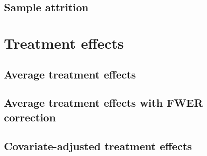 \documentclass[11pt]{article}
\begin{document}
        
        
        
        

	\clearpage

    \subsection{Sample attrition}

        
        
        

    \clearpage

\section{Treatment effects}

	\subsection{Average treatment effects}

		
        
        
		
		
		
		
        
		
		

	\clearpage

    \subsection{Average treatment effects with FWER correction}

        
        
        
        
        
        
        
        
        

    \clearpage

    \subsection{Covariate-adjusted treatment effects}
\end{document}
